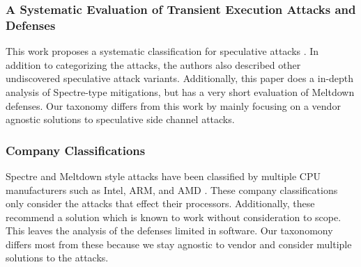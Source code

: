 \subsubsection{A Systematic Evaluation of Transient Execution Attacks and Defenses}

This work proposes a systematic classification for speculative attacks \cite{b48}. 
In addition to categorizing the attacks, the authors also described other undiscovered speculative attack variants.
Additionally, this paper does a in-depth analysis of Spectre-type mitigations, but has a very short evaluation of Meltdown defenses.
Our taxonomy differs from this work by mainly focusing on a vendor agnostic solutions to speculative side channel attacks.

\subsubsection{Company Classifications}

Spectre and Meltdown style attacks have been classified by multiple CPU manufacturers such as Intel, ARM, and AMD \cite{b55, b16, b53}.
These company classifications only consider the attacks that effect their processors.
Additionally, these recommend a solution which is known to work without consideration to scope.
This leaves the analysis of the defenses limited in software.
Our taxonomony differs most from these because we stay agnostic to vendor and consider multiple solutions to the attacks. 
